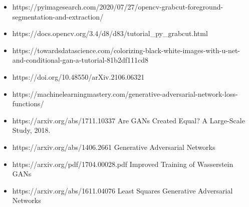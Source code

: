 \documentclass[
]{article}
\providecommand{\tightlist}{%
  \setlength{\itemsep}{0pt}\setlength{\parskip}{0pt}}
\begin{document}
\begin{itemize}
\tightlist
\item
  https://pyimagesearch.com/2020/07/27/opencv-grabcut-foreground-segmentation-and-extraction/
\item
  https://docs.opencv.org/3.4/d8/d83/tutorial\_py\_grabcut.html
\item
  https://towardsdatascience.com/colorizing-black-white-images-with-u-net-and-conditional-gan-a-tutorial-81b2df111cd8
\item
  https://doi.org/10.48550/arXiv.2106.06321
\item
  https://machinelearningmastery.com/generative-adversarial-network-loss-functions/
\item
  https://arxiv.org/abs/1711.10337 Are GANs Created Equal? A Large-Scale
  Study, 2018.
\item
  https://arxiv.org/abs/1406.2661 Generative Adversarial Networks
\item
  https://arxiv.org/pdf/1704.00028.pdf Improved Training of Wasserstein
  GANs
\item
  https://arxiv.org/abs/1611.04076 Least Squares Generative Adversarial
  Networks
\end{itemize}
\end{document}
